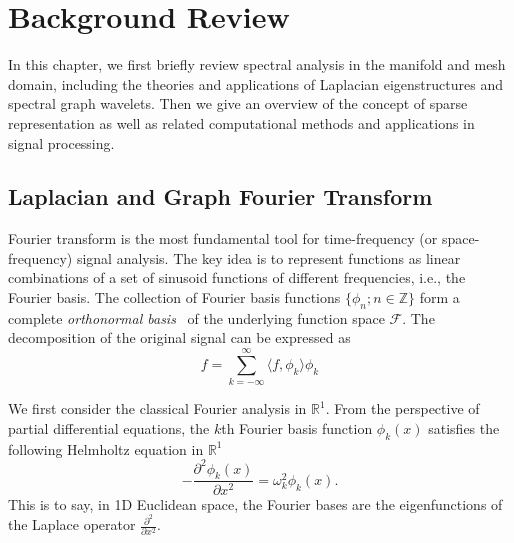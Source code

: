 \chapter{Background Review}
In this chapter, we first briefly review spectral analysis in the
manifold and mesh domain, including the theories and applications of
Laplacian eigenstructures and spectral graph wavelets.
Then we give an overview of the concept of sparse representation as
well as related computational methods and applications in signal processing.

\section{Laplacian and Graph Fourier Transform}
Fourier transform is the most fundamental tool for time-frequency (or space-frequency)
signal analysis. The key idea is to represent functions as linear combinations of a
set of sinusoid functions of different frequencies, i.e., the Fourier basis. The collection
of Fourier basis functions $\{\phi_n;n\in \mathbb{Z}\}$ form a complete
\textsl{orthonormal basis}~\cite{Gomes:1999} of the underlying function space $\mathcal{F}$.
The decomposition of the original signal can be expressed as
\begin{equation}
f=\sum_{k=-\infty}^\infty \langle f,\phi_k\rangle\phi_k
\end{equation}

We first consider the classical Fourier analysis in $\mathbb{R}^1$. From the perspective of
partial differential equations, the $k$th Fourier basis function $\phi_k(x)$
satisfies the following Helmholtz equation in $\mathbb{R}^1$
\begin{equation}\label{eq:Helmholtz1D}
-\frac{\partial^2 \phi_k(x)}{\partial x^2}=\omega_k^2 \phi_k(x).
\end{equation}
This is to say, in 1D Euclidean space, the Fourier bases are the eigenfunctions of the Laplace
operator $\frac{\partial^2}{\partial x^2}$.

